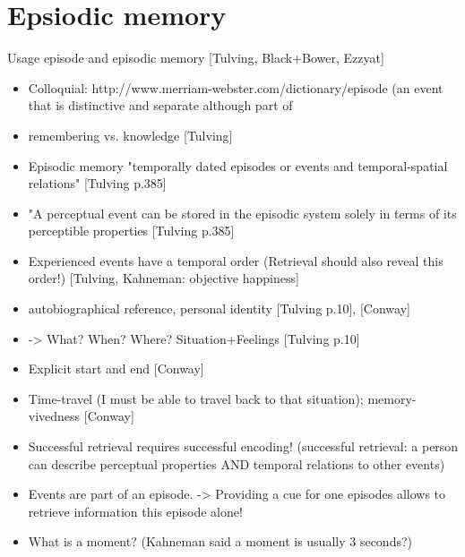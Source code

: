 \section{Epsiodic memory}
Usage episode and episodic memory [Tulving, Black+Bower, Ezzyat]
\begin{itemize}
\item Colloquial:  http://www.merriam-webster.com/dictionary/episode (an event that is distinctive and separate although part of \item remembering vs. knowledge [Tulving]

\item Episodic memory "temporally dated episodes or events and temporal-spatial relations" [Tulving p.385]
\item "A perceptual event can be stored in the episodic system solely in terms of its perceptible properties [Tulving p.385]
\item Experienced events have a temporal order (Retrieval should also reveal this order!) [Tulving, Kahneman: objective happiness]

\item autobiographical reference, personal identity [Tulving p.10], [Conway]
\item -> What? When? Where? Situation+Feelings [Tulving p.10]
\item Explicit start and end [Conway]
\item Time-travel (I must be able to travel back to that situation); memory-vivedness [Conway]
      
\item Successful retrieval requires successful encoding! (successful retrieval: a person can describe perceptual properties AND temporal relations to other events)

\item Events are part of an episode. -> Providing a cue for one episodes allows to retrieve information this episode alone!
\item What is a moment? (Kahneman said a moment is usually 3 seconds?)
\end{itemize}

